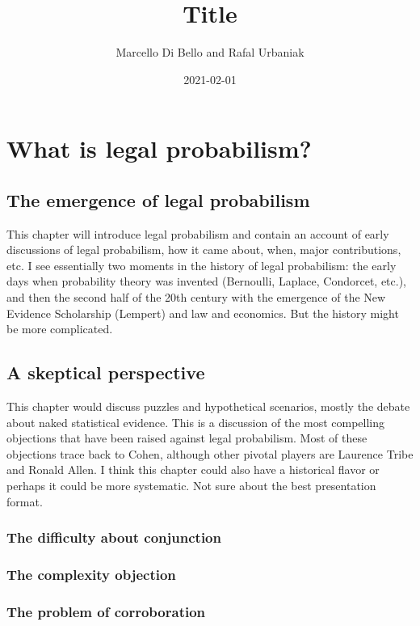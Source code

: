 \documentclass[]{book}
\title{Title}
\author{Marcello Di Bello and Rafal Urbaniak}
\date{2021-02-01}
\begin{document}
\maketitle

{
\setcounter{tocdepth}{1}
\tableofcontents
}
\part{What is legal probabilism?}

\chapter{The emergence of legal probabilism}

This chapter will introduce legal probabilism and contain an account of
early\\
discussions of legal probabilism, how it came about, when, major
contributions, etc. I see essentially two moments in the history of
legal probabilism: the early days when probability theory was invented
(Bernoulli, Laplace, Condorcet, etc.), and then the second half of the
20th century with the emergence of the New Evidence Scholarship
(Lempert) and law and economics. But the history might be more
complicated.

\chapter{A skeptical perspective}

This chapter would discuss puzzles and hypothetical scenarios, mostly
the debate about naked statistical evidence. This is a discussion of the
most compelling objections that have been raised against legal
probabilism. Most of these objections trace back to Cohen, although
other pivotal players are Laurence Tribe and Ronald Allen. I think this
chapter could also have a historical flavor or perhaps it could be more
systematic. Not sure about the best presentation format.

\section{The difficulty about conjunction}

\section{The complexity objection}

\section{The problem of corroboration}
\end{document}
